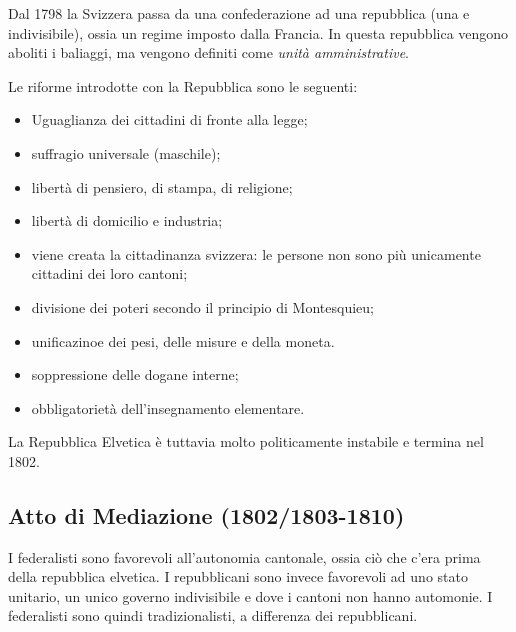 \documentclass[a4paper]{article}
\begin{document}
Dal 1798 la Svizzera passa da una confederazione ad una repubblica (una e indivisibile),
ossia un regime imposto dalla Francia.
In questa repubblica vengono aboliti i baliaggi, ma vengono definiti come \textit{unità amministrative}.


\pagebreak

Le riforme introdotte con la Repubblica sono le seguenti:
\begin{itemize}
    \item Uguaglianza dei cittadini di fronte alla legge;
    \item suffragio universale (maschile);
    \item libertà di pensiero, di stampa, di religione;
    \item libertà di domicilio e industria;
    \item viene creata la cittadinanza svizzera: le persone non sono più unicamente cittadini dei loro cantoni;
    \item divisione dei poteri secondo il principio di Montesquieu;
    \item unificazinoe dei pesi, delle misure e della moneta.
    \item soppressione delle dogane interne;
    \item obbligatorietà dell'insegnamento elementare.
\end{itemize}

La Repubblica Elvetica è tuttavia molto politicamente instabile e termina nel 1802.

\subsection{Atto di Mediazione (1802/1803-1810)}

\begin{center}
\end{center}

I federalisti sono favorevoli all'autonomia cantonale, ossia ciò che c'era prima della repubblica elvetica.
I repubblicani sono invece favorevoli ad uno stato unitario, un unico governo indivisibile e dove i cantoni non hanno automonie.
I federalisti sono quindi tradizionalisti, a differenza dei repubblicani.
\end{document}
